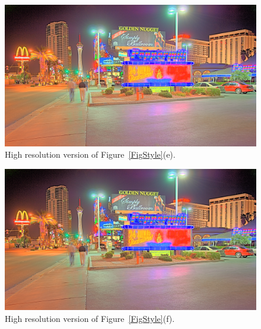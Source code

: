 \begin{figure}
\begin{center}
\includegraphics[width=\textwidth]{figures/chapter5/style_based/Peppermill_hdrcandy_v1.png}
\caption{High resolution version of Figure~\ref{FigStyle}(e).}
\end{center}
\end{figure}

\begin{figure}
\begin{center}
\includegraphics[width=\textwidth]{figures/chapter5/style_based/Peppermill_hdrcandy_v2.png}
\caption{High resolution version of Figure~\ref{FigStyle}(f).}
\end{center}
\end{figure}

